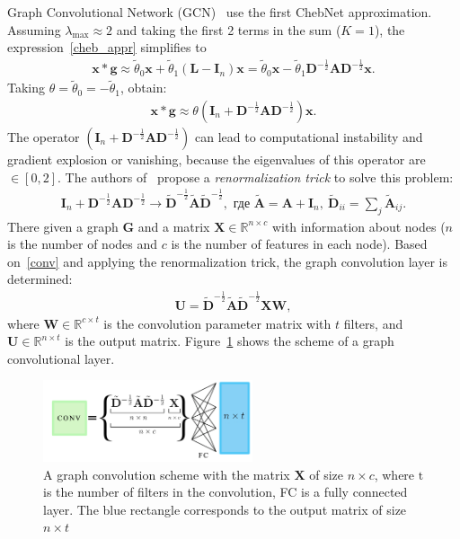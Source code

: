 \documentclass[12pt,twosides]{extarticle}
\begin{document}
Graph Convolutional Network (GCN)~\cite{kipf_semi-supervised_2017} use the first ChebNet approximation. Assuming $\lambda_{\max} \approx 2$ and taking the first 2 terms in the sum ($K=1$), the expression~\eqref{cheb_appr} simplifies to
\begin{align}
\mathbf{x} * \mathbf{g} \approx \tilde{\theta}_{0} \mathbf{x}+\tilde{\theta}_{1}\left(\mathbf{L}-\mathbf{I}_{n}\right) \mathbf{x}=\tilde{\theta}_{0} \mathbf{x}-\tilde{\theta}_{1} \mathbf{D}^{-\frac{1}{2}} \mathbf{A} \mathbf{D}^{-\frac{1}{2}} \mathbf{x}.
\end{align}
Taking $\theta = \tilde{\theta}_0  = -\tilde{\theta}_1$, obtain:
\begin{align}
\mathbf{x} * \mathbf{g}  \approx \theta\left(\mathbf{I}_{n}+\mathbf{D}^{-\frac{1}{2}} \mathbf{A} \mathbf{D}^{-\frac{1}{2}}\right) \mathbf{x}.
\label{conv}
\end{align}
The operator $\left(\mathbf{I}_{n}+\mathbf{D}^{-\frac{1}{2}} \mathbf{A} \mathbf{D}^{-\frac{1}{2}}\right) $ can lead to computational instability and gradient explosion or vanishing, because the eigenvalues of this operator are $\in [0,2]$. The authors of~\cite{kipf_semi-supervised_2017} propose a \textit{renormalization trick} to solve this problem:
\begin{align*}
\mathbf{I}_{n}+\mathbf{D}^{-\frac{1}{2}} \mathbf{A} \mathbf{D}^{-\frac{1}{2}} \rightarrow
\tilde{\mathbf{D}}^{-\frac{1}{2}} \tilde{\mathbf{A}}\tilde{\mathbf{D}}^{-\frac{1}{2}}, 
\text{ где }
\tilde{\mathbf{A}}=\mathbf{A}+\mathbf{I}_{n},~ \tilde{\mathbf{D}}_{i i}=\sum_{j} \tilde{\mathbf{A}}_{i j}.
\end{align*}
There given a graph $\mathbf{G}$ and a matrix $\mathbf{X} \in \mathbb{R}^{n \times c}$ with information about nodes ($n$ is the number of nodes and $c$ is the number of features in each node). Based on~\eqref{conv} and applying the renormalization trick, the graph convolution layer is determined:
\begin{align}
\textbf{U}=\tilde{\mathbf{D}}^{-\frac{1}{2}} \tilde{\mathbf{A}}\tilde{\mathbf{D}}^{-\frac{1}{2}} \mathbf{X} \mathbf{W},
\label{Z_conv}
\end{align}
where $\mathbf{W} \in \mathbb{R}^{c \times t}$ is the convolution parameter matrix with $t$ filters, and $\textbf{U} \in \mathbb{R}^{n \times t}$ is the output matrix. Figure~\ref{fig:convlayer} shows the scheme of a graph convolutional layer.
\begin{figure}[H]
	\centering
	\includegraphics[width=0.55\textwidth]{conv_layer.pdf}
	\caption{A graph convolution scheme with the matrix $\textbf{X}$ of size $ n \times c$, where $\text{t}$ is the number of filters in the convolution, FC is a fully connected layer. The blue rectangle corresponds to the output matrix of size $n\times t$}
	\label{fig:convlayer}
\end{figure}
\end{document}
